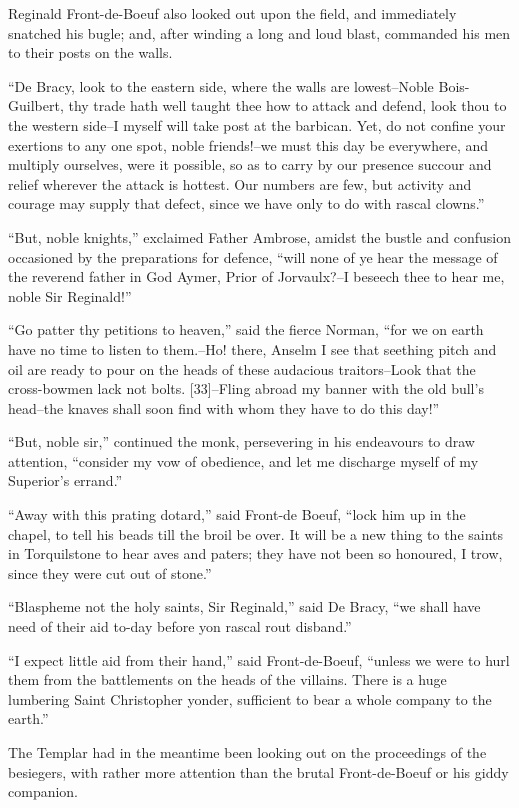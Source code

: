 Reginald Front-de-Boeuf also looked out upon the field, and immediately
snatched his bugle; and, after winding a long and loud blast, commanded
his men to their posts on the walls.

``De Bracy, look to the eastern side, where the walls are lowest--Noble
Bois-Guilbert, thy trade hath well taught thee how to attack and defend,
look thou to the western side--I myself will take post at the barbican.
Yet, do not confine your exertions to any one spot, noble friends!--we
must this day be everywhere, and multiply ourselves, were it possible,
so as to carry by our presence succour and relief wherever the attack is
hottest. Our numbers are few, but activity and courage may supply that
defect, since we have only to do with rascal clowns.''

``But, noble knights,'' exclaimed Father Ambrose, amidst the bustle and
confusion occasioned by the preparations for defence, ``will none of ye
hear the message of the reverend father in God Aymer, Prior of
Jorvaulx?--I beseech thee to hear me, noble Sir Reginald!''

``Go patter thy petitions to heaven,'' said the fierce Norman, ``for we
on earth have no time to listen to them.--Ho! there, Anselm I see that
seething pitch and oil are ready to pour on the heads of these audacious
traitors--Look that the cross-bowmen lack not bolts. {[}33{]}--Fling
abroad my banner with the old bull's head--the knaves shall soon find
with whom they have to do this day!''

``But, noble sir,'' continued the monk, persevering in his endeavours to
draw attention, ``consider my vow of obedience, and let me discharge
myself of my Superior's errand.''

``Away with this prating dotard,'' said Front-de Boeuf, ``lock him up in
the chapel, to tell his beads till the broil be over. It will be a new
thing to the saints in Torquilstone to hear aves and paters; they have
not been so honoured, I trow, since they were cut out of stone.''

``Blaspheme not the holy saints, Sir Reginald,'' said De Bracy, ``we
shall have need of their aid to-day before yon rascal rout disband.''

``I expect little aid from their hand,'' said Front-de-Boeuf, ``unless
we were to hurl them from the battlements on the heads of the villains.
There is a huge lumbering Saint Christopher yonder, sufficient to bear a
whole company to the earth.''

The Templar had in the meantime been looking out on the proceedings of
the besiegers, with rather more attention than the brutal Front-de-Boeuf
or his giddy companion.

